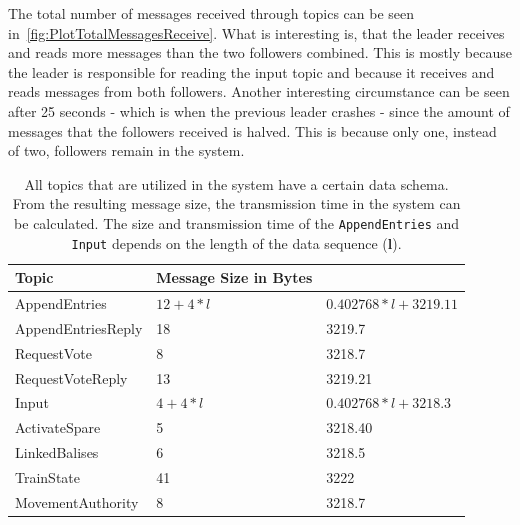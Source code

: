 The total number of messages received through  topics can be seen in~\autoref{fig:PlotTotalMessagesReceive}.
What is interesting is, that the leader receives and reads more messages than the two followers combined.
This is mostly because the leader is responsible for reading the input topic and because it receives and reads messages from both followers.
Another interesting circumstance can be seen after 25 seconds - which is when the previous leader crashes - since the amount of messages that the followers received is halved.
This is because only one, instead of two, followers remain in the system.



\begin{table}[h!]
	\begin{center}
		\caption{All topics that are utilized in the system have a certain data schema. From the resulting message size, the transmission time in the system can be calculated. The size and transmission time of the \texttt{AppendEntries} and \texttt{Input} depends on the length of the data sequence (\textbf{l}).}
		\label{tab:topicSendingTimes}
		\begin{tabularx}{\textwidth}{|X|X|}
			\hline
			\textbf{Topic} & \textbf{Message Size in Bytes} \\
			\hline \hline
			AppendEntries & $12 + 4 * l$ & $0.402768 * l + 3219.11$ \\
			\hline
			AppendEntriesReply & 18 & 3219.7 \\
			\hline
			RequestVote & 8 & 3218.7 \\
			\hline
			RequestVoteReply & 13 & 3219.21 \\
			\hline
			Input & $4 + 4 * l$ & $0.402768 * l + 3218.3$ \\
			\hline
			ActivateSpare & 5 & 3218.40 \\
			\hline
			LinkedBalises & 6 & 3218.5 \\
			\hline
			TrainState & 41 & 3222 \\
			\hline
			MovementAuthority & 8 & 3218.7 \\
			\hline
		\end{tabularx}
	\end{center}
\end{table}


